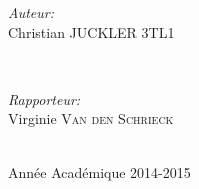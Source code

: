 \begin{titlepage}
\begin{minipage}{0.4\textwidth}
\begin{flushleft} \large
\emph{Auteur:}\\
Christian \textsc{JUCKLER} 3TL1 %
\end{flushleft}
\end{minipage}\\[1cm]
\begin{minipage}{0.4\textwidth}
\begin{flushleft} \large
\emph{Rapporteur:} \\
Virginie \textsc{Van den Schrieck} %
\end{flushleft}
\end{minipage}\\[4cm]



{\large Année Académique 2014-2015}\\[3cm] %

\vfill %

\end{titlepage}